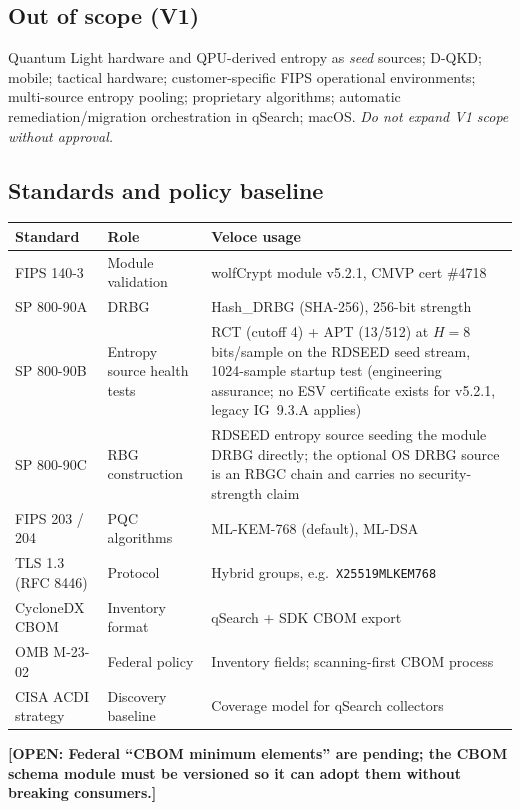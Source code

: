 \documentclass[10pt]{article}
\newcommand{\open}[1]{\textcolor{fipsgold}{\sffamily\bfseries\small [OPEN: #1]}}
\newcommand{\code}[1]{\texttt{\small #1}}
\begin{document}
\subsection{Out of scope (V1)}
Quantum Light hardware and QPU-derived entropy as \emph{seed} sources; D-QKD; mobile;
tactical hardware; customer-specific FIPS operational environments; multi-source entropy
pooling; proprietary algorithms; automatic remediation/migration orchestration in qSearch;
macOS. \emph{Do not expand V1 scope without approval.}

\subsection{Standards and policy baseline}
\begin{small}
\begin{tabularx}{\textwidth}{@{}llL@{}}
\toprule
\textbf{Standard} & \textbf{Role} & \textbf{Veloce usage} \\
\midrule
FIPS 140-3 & Module validation & wolfCrypt module v5.2.1, CMVP cert \#4718 \\
SP 800-90A & DRBG & Hash\_DRBG (SHA-256), 256-bit strength \\
SP 800-90B & Entropy source health tests & RCT (cutoff 4) + APT (13/512) at
  $H = 8$ bits/sample on the RDSEED seed stream, 1024-sample startup test (engineering
  assurance; no ESV certificate exists for v5.2.1, legacy IG~9.3.A applies) \\
SP 800-90C & RBG construction & RDSEED entropy source seeding the module DRBG directly;
  the optional OS DRBG source is an RBGC chain and carries no security-strength claim \\
FIPS 203 / 204 & PQC algorithms & ML-KEM-768 (default), ML-DSA \\
TLS 1.3 (RFC 8446) & Protocol & Hybrid groups, e.g.\ \code{X25519MLKEM768} \\
CycloneDX CBOM & Inventory format & qSearch + SDK CBOM export \\
OMB M-23-02 & Federal policy & Inventory fields; scanning-first CBOM process \\
CISA ACDI strategy & Discovery baseline & Coverage model for qSearch collectors \\
\bottomrule
\end{tabularx}
\end{small}

\open{Federal ``CBOM minimum elements'' are pending; the CBOM schema module must be
versioned so it can adopt them without breaking consumers.}
\end{document}
